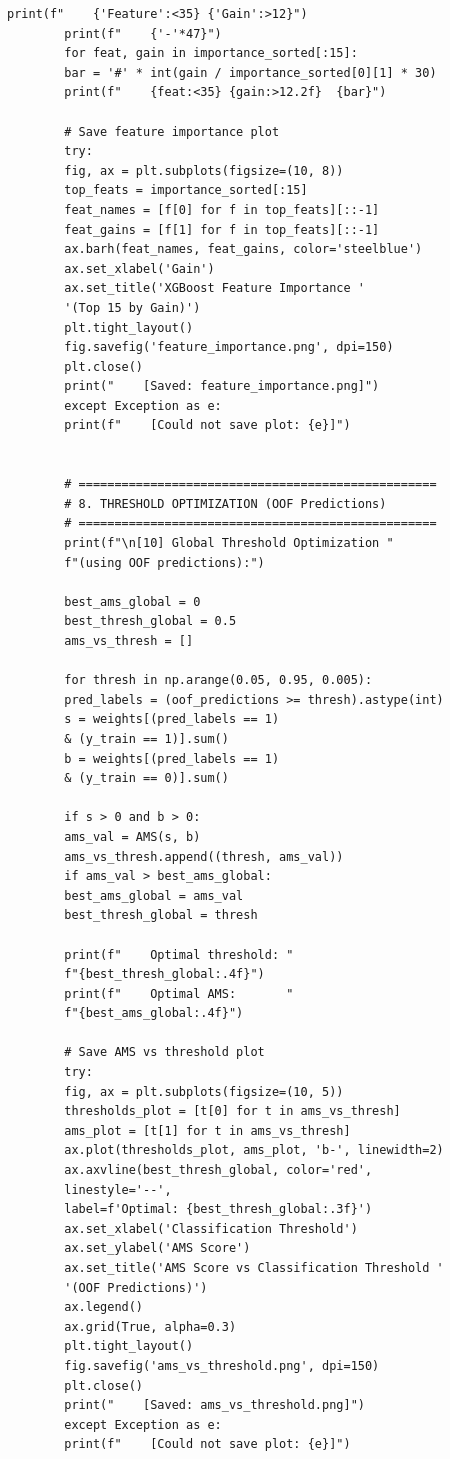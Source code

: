 \documentclass[12pt]{article}
\begin{document}
\begin{lstlisting}[caption={Main.py -- Complete implementation}]
		print(f"    {'Feature':<35} {'Gain':>12}")
		print(f"    {'-'*47}")
		for feat, gain in importance_sorted[:15]:
		bar = '#' * int(gain / importance_sorted[0][1] * 30)
		print(f"    {feat:<35} {gain:>12.2f}  {bar}")
		
		# Save feature importance plot
		try:
		fig, ax = plt.subplots(figsize=(10, 8))
		top_feats = importance_sorted[:15]
		feat_names = [f[0] for f in top_feats][::-1]
		feat_gains = [f[1] for f in top_feats][::-1]
		ax.barh(feat_names, feat_gains, color='steelblue')
		ax.set_xlabel('Gain')
		ax.set_title('XGBoost Feature Importance '
		'(Top 15 by Gain)')
		plt.tight_layout()
		fig.savefig('feature_importance.png', dpi=150)
		plt.close()
		print("    [Saved: feature_importance.png]")
		except Exception as e:
		print(f"    [Could not save plot: {e}]")
		
		
		# ==================================================
		# 8. THRESHOLD OPTIMIZATION (OOF Predictions)
		# ==================================================
		print(f"\n[10] Global Threshold Optimization "
		f"(using OOF predictions):")
		
		best_ams_global = 0
		best_thresh_global = 0.5
		ams_vs_thresh = []
		
		for thresh in np.arange(0.05, 0.95, 0.005):
		pred_labels = (oof_predictions >= thresh).astype(int)
		s = weights[(pred_labels == 1)
		& (y_train == 1)].sum()
		b = weights[(pred_labels == 1)
		& (y_train == 0)].sum()
		
		if s > 0 and b > 0:
		ams_val = AMS(s, b)
		ams_vs_thresh.append((thresh, ams_val))
		if ams_val > best_ams_global:
		best_ams_global = ams_val
		best_thresh_global = thresh
		
		print(f"    Optimal threshold: "
		f"{best_thresh_global:.4f}")
		print(f"    Optimal AMS:       "
		f"{best_ams_global:.4f}")
		
		# Save AMS vs threshold plot
		try:
		fig, ax = plt.subplots(figsize=(10, 5))
		thresholds_plot = [t[0] for t in ams_vs_thresh]
		ams_plot = [t[1] for t in ams_vs_thresh]
		ax.plot(thresholds_plot, ams_plot, 'b-', linewidth=2)
		ax.axvline(best_thresh_global, color='red',
		linestyle='--',
		label=f'Optimal: {best_thresh_global:.3f}')
		ax.set_xlabel('Classification Threshold')
		ax.set_ylabel('AMS Score')
		ax.set_title('AMS Score vs Classification Threshold '
		'(OOF Predictions)')
		ax.legend()
		ax.grid(True, alpha=0.3)
		plt.tight_layout()
		fig.savefig('ams_vs_threshold.png', dpi=150)
		plt.close()
		print("    [Saved: ams_vs_threshold.png]")
		except Exception as e:
		print(f"    [Could not save plot: {e}]")
		

\end{lstlisting}
\end{document}
